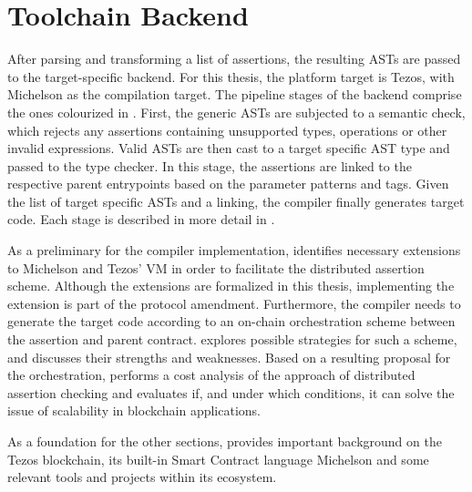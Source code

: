 \chapter{Toolchain Backend}\label{chap:offline_tezos}
After parsing and transforming a list of assertions, the resulting ASTs are passed to the target-specific backend. For this thesis, the platform target is Tezos, with Michelson as the compilation target. The pipeline stages of the backend comprise the ones colourized in . First, the generic ASTs are subjected to a semantic check, which rejects any assertions containing unsupported types, operations or other invalid expressions. Valid ASTs are then cast to a target specific AST type and passed to the type checker. In this stage, the assertions are linked to the respective parent entrypoints based on the parameter patterns and tags. Given the list of target specific ASTs and a linking, the compiler finally generates target code. Each stage is described in more detail in .

As a preliminary for the compiler implementation,  identifies necessary extensions to Michelson and Tezos' VM in order to facilitate the distributed assertion scheme. Although the extensions are formalized in this thesis, implementing the extension is part of the protocol amendment. Furthermore, the compiler needs to generate the target code according to an on-chain orchestration scheme between the assertion and parent contract.  explores possible strategies for such a scheme, and discusses their strengths and weaknesses. Based on a resulting proposal for the orchestration,  performs a cost analysis of the approach of distributed assertion checking and evaluates if, and under which conditions, it can solve the issue of scalability in blockchain applications.

As a foundation for the other sections,  provides important background on the Tezos blockchain, its built-in Smart Contract language Michelson and some relevant tools and projects within its ecosystem.

